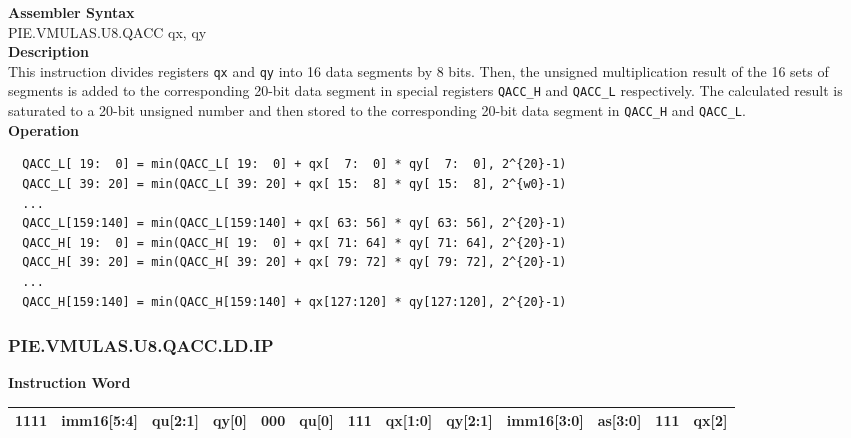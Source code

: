 \textbf{Assembler Syntax} \\
PIE.VMULAS.U8.QACC qx, qy \\
\textbf{Description} \\
This instruction divides registers \lstinline{qx} and \lstinline{qy} into 16 data segments by 8 bits. Then, the unsigned multiplication result of the 16 sets of segments is added to the corresponding 20-bit data segment in special registers \lstinline{QACC_H} and \lstinline{QACC_L} respectively. The calculated result is saturated to a 20-bit unsigned number and then stored to the corresponding 20-bit data segment in \lstinline{QACC_H} and \lstinline{QACC_L}.\\
\textbf{Operation}
\begin{lstlisting}
  QACC_L[ 19:  0] = min(QACC_L[ 19:  0] + qx[  7:  0] * qy[  7:  0], 2^{20}-1)
  QACC_L[ 39: 20] = min(QACC_L[ 39: 20] + qx[ 15:  8] * qy[ 15:  8], 2^{w0}-1)
  ...
  QACC_L[159:140] = min(QACC_L[159:140] + qx[ 63: 56] * qy[ 63: 56], 2^{20}-1)
  QACC_H[ 19:  0] = min(QACC_H[ 19:  0] + qx[ 71: 64] * qy[ 71: 64], 2^{20}-1)
  QACC_H[ 39: 20] = min(QACC_H[ 39: 20] + qx[ 79: 72] * qy[ 79: 72], 2^{20}-1)
  ...
  QACC_H[159:140] = min(QACC_H[159:140] + qx[127:120] * qy[127:120], 2^{20}-1)
\end{lstlisting}

\newpage
\subsubsection{PIE.VMULAS.U8.QACC.LD.IP}\label{instruction:PIEVMULASU8QACCLDIP}
\setlength\tabcolsep{6pt}
\textbf{Instruction Word} \\
\begin{tabular}{|c|c|c|c|c|c|c|c|c|c|c|c|c|}
	\hline
	1111 & imm16[5:4] & qu[2:1] & qy[0] & 000 & qu[0] & 111 & qx[1:0] & qy[2:1] & imm16[3:0] & as[3:0] & 111 & qx[2] \\
	\hline
\end{tabular}

